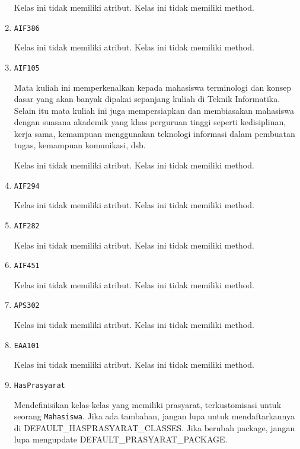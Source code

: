 \documentclass{article}
\begin{document}
\begin{enumerate}
Kelas ini tidak memiliki atribut. Kelas ini tidak memiliki method. \item \texttt{AIF386}



Kelas ini tidak memiliki atribut. Kelas ini tidak memiliki method. \item \texttt{AIF105}

Mata kuliah ini memperkenalkan kepada mahasiswa terminologi dan konsep dasar 
 yang akan banyak dipakai sepanjang kuliah di Teknik Informatika. Selain itu 
 mata kuliah ini juga mempersiapkan dan membiasakan mahasiswa dengan suasana 
 akademik yang khas perguruan tinggi seperti kedisiplinan, kerja sama, 
 kemampuan menggunakan teknologi informasi dalam pembuatan tugas, kemampuan 
 komunikasi, dsb.

Kelas ini tidak memiliki atribut. Kelas ini tidak memiliki method. \item \texttt{AIF294}



Kelas ini tidak memiliki atribut. Kelas ini tidak memiliki method. \item \texttt{AIF282}



Kelas ini tidak memiliki atribut. Kelas ini tidak memiliki method. \item \texttt{AIF451}



Kelas ini tidak memiliki atribut. Kelas ini tidak memiliki method. \item \texttt{APS302}



Kelas ini tidak memiliki atribut. Kelas ini tidak memiliki method. \item \texttt{EAA101}



Kelas ini tidak memiliki atribut. Kelas ini tidak memiliki method. \item \texttt{HasPrasyarat}

Mendefinisikan kelas-kelas yang memiliki prasyarat, terkustomisasi
 untuk seorang \texttt{Mahasiswa}. Jika ada tambahan, jangan lupa untuk
 mendaftarkannya di DEFAULT\_HASPRASYARAT\_CLASSES. Jika berubah package,
 jangan lupa mengupdate DEFAULT\_PRASYARAT\_PACKAGE.


\end{enumerate}
\end{document}
